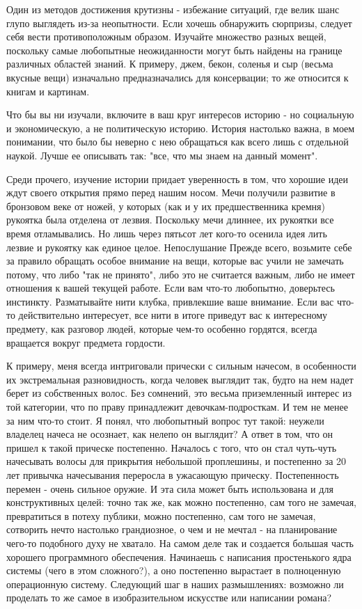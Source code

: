 \documentclass[ebook,12pt,oneside,openany]{memoir}
\begin{document}
Один из методов достижения крутизны - избежание ситуаций, где велик
шанс глупо выглядеть из-за неопытности. Если хочешь обнаружить
сюрпризы, следует себя вести противоположным образом. Изучайте
множество разных вещей, поскольку самые любопытные неожиданности могут
быть найдены на границе различных областей знаний. К примеру, джем,
бекон, соленья и сыр (весьма вкусные вещи) изначально предназначались
для консервации; то же относится к книгам и картинам.

Что бы вы ни изучали, включите в ваш круг интересов историю - но
социальную и экономическую, а не политическую историю. История
настолько важна, в моем понимании, что было бы неверно с нею
обращаться как всего лишь с отдельной наукой. Лучше ее описывать так:
"все, что мы знаем на данный момент".

Среди прочего, изучение истории придает уверенность в том, что хорошие
идеи ждут своего открытия прямо перед нашим носом. Мечи получили
развитие в бронзовом веке от ножей, у которых (как и у их
предшественника кремня) рукоятка была отделена от лезвия. Поскольку
мечи длиннее, их рукоятки все время отламывались. Но лишь через
пятьсот лет кого-то осенила идея лить лезвие и рукоятку как единое
целое. Непослушание Прежде всего, возьмите себе за правило обращать
особое внимание на вещи, которые вас учили не замечать потому, что
либо "так не принято", либо это не считается важным, либо не имеет
отношения к вашей текущей работе. Если вам что-то любопытно,
доверьтесь инстинкту. Разматывайте нити клубка, привлекшие ваше
внимание. Если вас что-то действительно интересует, все нити в итоге
приведут вас к интересному предмету, как разговор людей, которые
чем-то особенно гордятся, всегда вращается вокруг предмета гордости.

К примеру, меня всегда интриговали прически с сильным начесом, в
особенности их экстремальная разновидность, когда человек выглядит
так, будто на нем надет берет из собственных волос. Без сомнений, это
весьма приземленный интерес из той категории, что по праву принадлежит
девочкам-подросткам. И тем не менее за ним что-то стоит. Я понял, что
любопытный вопрос тут такой: неужели владелец начеса не осознает, как
нелепо он выглядит? А ответ в том, что он пришел к такой прическе
постепенно. Началось с того, что он стал чуть-чуть начесывать волосы
для прикрытия небольшой проплешины, и постепенно за 20 лет привычка
начесывания переросла в ужасающую прическу. Постепенность перемен -
очень сильное оружие. И эта сила может быть использована и для
конструктивных целей: точно так же, как можно постепенно, сам того не
замечая, превратиться в потеху публики, можно постепенно, сам того не
замечая, сотворить нечто настолько грандиозное, о чем и не мечтал - на
планирование чего-то подобного духу не хватало. На самом деле так и
создается большая часть хорошего программного обеспечения. Начинаешь с
написания простенького ядра системы (чего в этом сложного?), а оно
постепенно вырастает в полноценную операционную систему. Следующий шаг
в наших размышлениях: возможно ли проделать то же самое в
изобразительном искусстве или написании романа?
\end{document}
